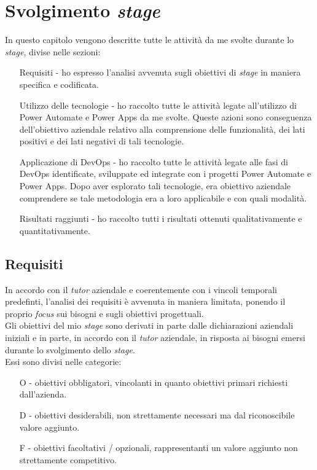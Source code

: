 \chapter{Svolgimento \emph{stage}}
\label{cap:svolgimentoStage}
In questo capitolo vengono descritte tutte le attività da me svolte durante lo \emph{stage}, divise nelle sezioni:
\begin{enumerate}
	\item[Requisiti -]ho espresso l'analisi avvenuta sugli obiettivi di \emph{stage} in maniera specifica e codificata.
    \item[Utilizzo delle tecnologie - ]ho raccolto tutte le attività legate all'utilizzo di Power Automate e Power Apps da me svolte. Queste azioni sono conseguenza dell'obiettivo aziendale relativo alla comprensione delle funzionalità, dei lati positivi e dei lati negativi di tali tecnologie.
    \item[Applicazione di DevOps -]ho raccolto tutte le attività legate alle fasi di DevOps identificate, sviluppate ed integrate con i progetti Power Automate e Power Apps. Dopo aver esplorato tali tecnologie, era obiettivo aziendale comprendere se tale metodologia era a loro applicabile e con quali modalità.
    \item[Risultati raggiunti - ]ho raccolto tutti i risultati ottenuti qualitativamente e quantitativamente.
\end{enumerate}

\section{Requisiti}%
In accordo con il \emph{tutor} aziendale e coerentemente con i vincoli temporali predefinti, l'analisi dei requisiti è avvenuta in maniera limitata, ponendo il proprio \emph{focus} sui bisogni e sugli obiettivi progettuali.\\
Gli obiettivi del mio \emph{stage} sono derivati in parte dalle dichiarazioni aziendali iniziali e in parte, in accordo con il \emph{tutor} aziendale, in risposta ai bisogni emersi durante lo svolgimento dello \emph{stage}.\\
Essi sono divisi nelle categorie:
\begin{enumerate}
	\item[O -]obiettivi obbligatori, vincolanti in quanto obiettivi primari richiesti dall'azienda.
    \item[D -]obiettivi desiderabili, non strettamente necessari ma dal riconoscibile valore aggiunto.
    \item[F -]obiettivi facoltativi / opzionali, rappresentanti un valore aggiunto non strettamente competitivo.
\end{enumerate}

